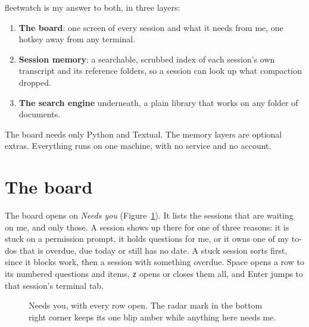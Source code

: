 \documentclass[11pt, letterpaper]{article}
\newcommand{\cmd}[1]{\texttt{#1}}
\begin{document}
fleetwatch is my answer to both, in three layers:

\begin{enumerate}
  \item \textbf{The board}: one screen of every session and what it needs from me, one
    hotkey away from any terminal.
  \item \textbf{Session memory}: a searchable, scrubbed index of each session's own
    transcript and its reference folders, so a session can look up what compaction dropped.
  \item \textbf{The search engine} underneath, a plain library that works on any folder of
    documents.
\end{enumerate}

The board needs only Python and Textual. The memory layers are optional extras. Everything
runs on one machine, with no service and no account.

\section{The board}

The board opens on \emph{Needs you} (Figure~\ref{fig:board-needs-you}). It lists the
sessions that are waiting on me, and only those. A session shows up there for one of three
reasons: it is stuck on a permission prompt, it holds questions for me, or it owns one of
my to-dos that is overdue, due today or still has no date. A stuck session sorts first,
since it blocks work, then a session with something overdue. Space opens a row to its
numbered questions and items, \cmd{z} opens or closes them all, and Enter jumps to that
session's terminal tab.

\begin{figure}[htbp]
  \centering
  \caption{Needs you, with every row open. The radar mark in the bottom right corner keeps its
    one blip amber while anything here needs me.}
  \label{fig:board-needs-you}
\end{figure}
\end{document}

